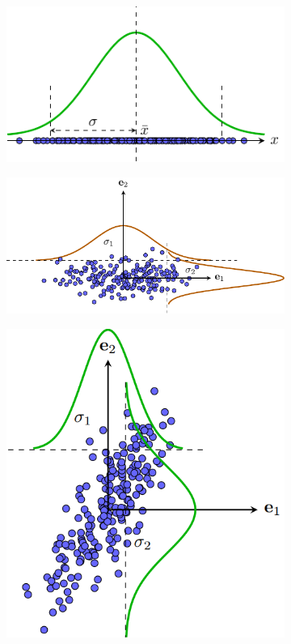 \documentclass[14pt,oneside,a4paper]{report}
\numberwithin{equation}{section}
\begin{document}
\begin{figure}[t]
\begin{subfigure}{0.325\textwidth}
	\includegraphics[width=0.99\linewidth]{var_1d.pdf}
	\caption{}
	\label{fig:27_2a}
\end{subfigure}
\begin{subfigure}{0.325\textwidth}
	\includegraphics[width=0.99\linewidth]{pca_diagvar.pdf}
	\caption{}
	\label{fig:27_2b}
\end{subfigure}
\begin{subfigure}{0.325\textwidth}
	\includegraphics[width=0.8\linewidth]{pca_var.png}

\end{subfigure}
\end{figure}
\end{document}
